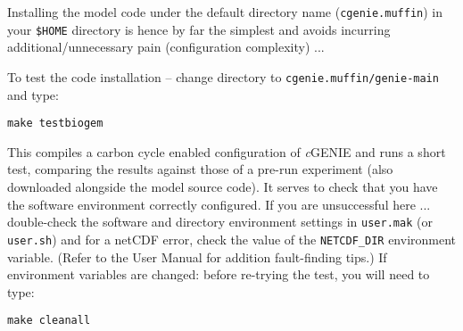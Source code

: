 \documentclass[10pt,twoside]{article}
\begin{document}
\begin{compactenum}
Installing the model code under the default directory name
(\texttt{cgenie.muffin}) in your \texttt{\$HOME} directory is hence by
far the simplest and avoids incurring additional/unnecessary pain
(configuration complexity) ...

\item To test the code installation -- change directory to
  \texttt{cgenie.muffin/genie-main} and type:
  \vspace{-5pt}
\begin{verbatim}
make testbiogem
\end{verbatim}
\vspace{-5pt}
This compiles a carbon cycle enabled configuration of \textit{c}GENIE
and runs a short test, comparing the results against those of a
pre-run experiment (also downloaded alongside the model source
code). It serves to check that you have the software environment
correctly configured. If you are unsuccessful here ... double-check
the software and directory environment settings in \texttt{user.mak}
(or \texttt{user.sh}) and for a netCDF error, check the value of the
\texttt{NETCDF\_DIR} environment variable. (Refer to the User Manual
for addition fault-finding tips.) If environment variables are
changed: before re-trying the test, you will need to type:
\vspace{-5pt}\begin{verbatim}
make cleanall
\end{verbatim}\vspace{-5pt}

\end{compactenum}

\end{document}
